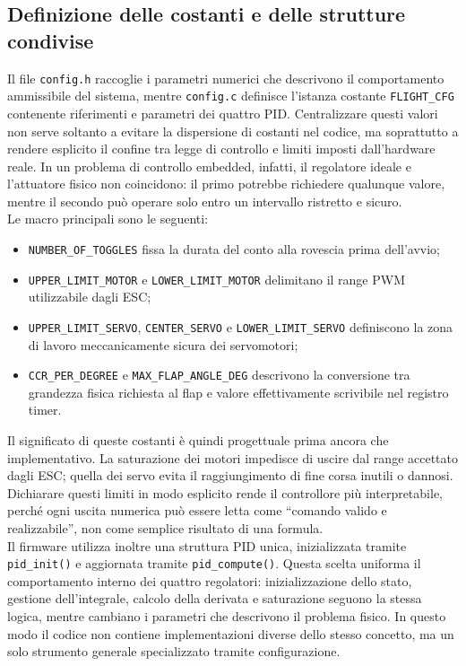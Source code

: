 \documentclass[11pt]{report}
\begin{document}
	\subsection{Definizione delle costanti e delle strutture condivise}
	Il file \texttt{config.h} raccoglie i parametri numerici che descrivono il comportamento ammissibile del sistema, mentre \texttt{config.c} definisce l'istanza costante \texttt{FLIGHT\_CFG} contenente riferimenti e parametri dei quattro PID. Centralizzare questi valori non serve soltanto a evitare la dispersione di costanti nel codice, ma soprattutto a rendere esplicito il confine tra legge di controllo e limiti imposti dall'hardware reale. In un problema di controllo embedded, infatti, il regolatore ideale e l'attuatore fisico non coincidono: il primo potrebbe richiedere qualunque valore, mentre il secondo può operare solo entro un intervallo ristretto e sicuro.\\
	Le macro principali sono le seguenti:
	\begin{itemize}
		\item \texttt{NUMBER\_OF\_TOGGLES} fissa la durata del conto alla rovescia prima dell'avvio;
		\item \texttt{UPPER\_LIMIT\_MOTOR} e \texttt{LOWER\_LIMIT\_MOTOR} delimitano il range PWM utilizzabile dagli ESC;
		\item \texttt{UPPER\_LIMIT\_SERVO}, \texttt{CENTER\_SERVO} e \texttt{LOWER\_LIMIT\_SERVO} definiscono la zona di lavoro meccanicamente sicura dei servomotori;
		\item \texttt{CCR\_PER\_DEGREE} e \texttt{MAX\_FLAP\_ANGLE\_DEG} descrivono la conversione tra grandezza fisica richiesta al flap e valore effettivamente scrivibile nel registro timer.
	\end{itemize}

	Il significato di queste costanti è quindi progettuale prima ancora che implementativo. La saturazione dei motori impedisce di uscire dal range accettato dagli ESC; quella dei servo evita il raggiungimento di fine corsa inutili o dannosi. Dichiarare questi limiti in modo esplicito rende il controllore più interpretabile, perché ogni uscita numerica può essere letta come ``comando valido e realizzabile'', non come semplice risultato di una formula.\\
	Il firmware utilizza inoltre una struttura PID unica, inizializzata tramite \texttt{pid\_init()} e aggiornata tramite \texttt{pid\_compute()}. Questa scelta uniforma il comportamento interno dei quattro regolatori: inizializzazione dello stato, gestione dell'integrale, calcolo della derivata e saturazione seguono la stessa logica, mentre cambiano i parametri che descrivono il problema fisico. In questo modo il codice non contiene implementazioni diverse dello stesso concetto, ma un solo strumento generale specializzato tramite configurazione.
\end{document}
